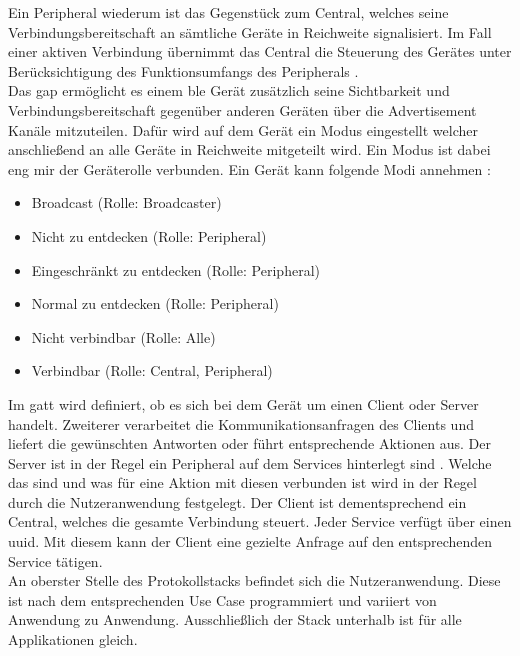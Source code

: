 \noindent Ein Peripheral wiederum ist das Gegenstück zum Central, welches seine Verbindungsbereitschaft an sämtliche Geräte in Reichweite signalisiert. Im Fall einer aktiven Verbindung übernimmt das Central die Steuerung des Gerätes unter Berücksichtigung des Funktionsumfangs des Peripherals \cite[Seite 34]{Usama17:BBS}.\\

\noindent Das \ac{gap} ermöglicht es einem \ac{ble} Gerät zusätzlich seine Sichtbarkeit und Verbindungsbereitschaft gegenüber anderen Geräten über die Advertisement Kanäle mitzuteilen. Dafür wird auf dem Gerät ein Modus eingestellt welcher anschließend an alle Geräte in Reichweite mitgeteilt wird. Ein Modus ist dabei eng mir der Geräterolle verbunden. Ein Gerät kann folgende Modi annehmen \cite[Seite 35]{Townsend14:GSB}:
\begin{itemize}
	\item{Broadcast (Rolle: Broadcaster)}
	\item{Nicht zu entdecken (Rolle: Peripheral)}
	\item{Eingeschränkt zu entdecken (Rolle: Peripheral)}
	\item{Normal zu entdecken (Rolle: Peripheral)}
	\item{Nicht verbindbar (Rolle: Alle)}
	\item{Verbindbar (Rolle: Central, Peripheral)}
\end{itemize}   

\noindent Im \ac{gatt} wird definiert, ob es sich bei dem Gerät um einen Client oder Server handelt. Zweiterer verarbeitet die Kommunikationsanfragen des Clients und liefert die gewünschten Antworten oder führt entsprechende Aktionen aus. Der Server ist in der Regel ein Peripheral auf dem Services hinterlegt sind \cite[Seite 30]{Usama17:BBS}. Welche das sind und was für eine Aktion mit diesen verbunden ist wird in der Regel durch die Nutzeranwendung festgelegt. Der Client ist dementsprechend ein Central, welches die gesamte Verbindung steuert. Jeder Service verfügt über einen \ac{uuid}. Mit diesem kann der Client eine gezielte Anfrage auf den entsprechenden Service tätigen.\\    

\noindent An oberster Stelle des Protokollstacks befindet sich die Nutzeranwendung. Diese ist nach dem entsprechenden Use Case programmiert und variiert von Anwendung zu Anwendung. Ausschließlich der Stack unterhalb ist für alle Applikationen gleich.\\

